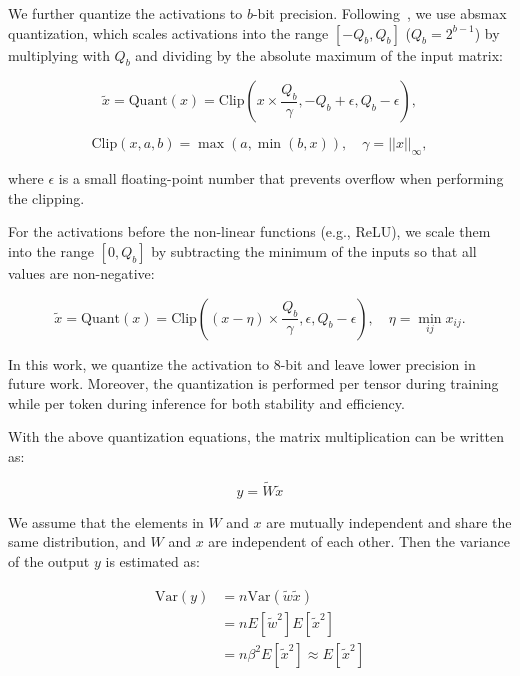 We further quantize the activations to $b$-bit precision. Following~\cite{llmint8}, we use absmax quantization, which scales activations into the range $[-Q_b, Q_b]$ ($Q_b=2^{b-1}$) by multiplying with $Q_b$ and dividing by the absolute maximum of the input matrix:

\begin{equation}
    \widetilde{x} = \mathrm{Quant}(x) = \mathrm{Clip}(x \times \frac{Q_b}{\gamma}, -Q_b+\epsilon, Q_b-\epsilon),
    \label{eq_quant_act}
\end{equation}

\begin{equation}
    \mathrm{Clip}(x, a, b) = \max(a, \min(b, x)), \quad \gamma = ||x||_{\infty},
    \label{eq_clip}
\end{equation}

where $\epsilon$ is a small floating-point number that prevents overflow when performing the clipping.

For the activations before the non-linear functions (e.g., ReLU), we scale them into the range $[0, Q_b]$ by subtracting the minimum of the inputs so that all values are non-negative:

\begin{equation}
    \widetilde{x} = \mathrm{Quant}(x) = \mathrm{Clip}((x-\eta) \times \frac{Q_b}{\gamma}, \epsilon, Q_b-\epsilon), \quad \eta = \min_{ij} x_{ij}.
\end{equation}

In this work, we quantize the activation to 8-bit and leave lower precision in future work. Moreover, the quantization is performed per tensor during training while per token during inference for both stability and efficiency.

With the above quantization equations, the matrix multiplication can be written as:

\begin{equation}
    y = \widetilde{W} \widetilde{x}
\end{equation}

We assume that the elements in $W$ and $x$ are mutually independent and share the same distribution, and $W$ and $x$ are independent of each other. Then the variance of the output $y$ is estimated as:

\begin{align}
    \mathrm{Var}(y) &= n \mathrm{Var}(\widetilde{w} \widetilde{x}) \\
    &=n E[\widetilde{w}^2] E[\widetilde{x}^2] \\
    &=n \beta^2 E[\widetilde{x}^2] \approx E[\widetilde{x}^2]
\end{align}

